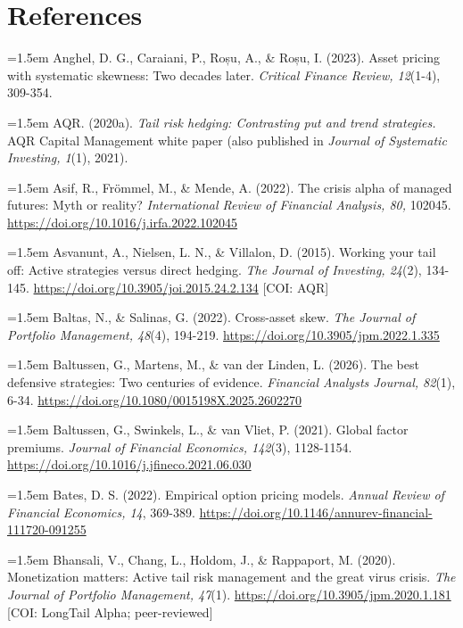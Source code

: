 \documentclass[12pt, a4paper]{article}
\begin{document}
\newpage

\section*{References}\label{references}

\hangindent=1.5em
Anghel, D. G., Caraiani, P., Roșu, A., \& Roșu, I. (2023). Asset pricing
with systematic skewness: Two decades later. \emph{Critical Finance
Review, 12}(1-4), 309-354.

\hangindent=1.5em
AQR. (2020a). \emph{Tail risk hedging: Contrasting put and trend
strategies.} AQR Capital Management white paper (also published in
\emph{Journal of Systematic Investing, 1}(1), 2021).

\hangindent=1.5em
Asif, R., Frömmel, M., \& Mende, A. (2022). The crisis alpha of managed
futures: Myth or reality? \emph{International Review of Financial
Analysis, 80,} 102045. \url{https://doi.org/10.1016/j.irfa.2022.102045}

\hangindent=1.5em
Asvanunt, A., Nielsen, L. N., \& Villalon, D. (2015). Working your tail
off: Active strategies versus direct hedging. \emph{The Journal of
Investing, 24}(2), 134-145. \url{https://doi.org/10.3905/joi.2015.24.2.134}
{[}COI: AQR{]}

\hangindent=1.5em
Baltas, N., \& Salinas, G. (2022). Cross-asset skew. \emph{The Journal
of Portfolio Management, 48}(4), 194-219.
\url{https://doi.org/10.3905/jpm.2022.1.335}

\hangindent=1.5em
Baltussen, G., Martens, M., \& van der Linden, L. (2026). The best
defensive strategies: Two centuries of evidence. \emph{Financial
Analysts Journal, 82}(1), 6-34.
\url{https://doi.org/10.1080/0015198X.2025.2602270}

\hangindent=1.5em
Baltussen, G., Swinkels, L., \& van Vliet, P. (2021). Global factor
premiums. \emph{Journal of Financial Economics, 142}(3), 1128-1154.
\url{https://doi.org/10.1016/j.jfineco.2021.06.030}

\hangindent=1.5em
Bates, D. S. (2022). Empirical option pricing models. \emph{Annual
Review of Financial Economics, 14}, 369-389.
\url{https://doi.org/10.1146/annurev-financial-111720-091255}

\hangindent=1.5em
Bhansali, V., Chang, L., Holdom, J., \& Rappaport, M. (2020).
Monetization matters: Active tail risk management and the great virus
crisis. \emph{The Journal of Portfolio Management, 47}(1).
\url{https://doi.org/10.3905/jpm.2020.1.181} {[}COI: LongTail Alpha;
peer-reviewed{]}
\end{document}

